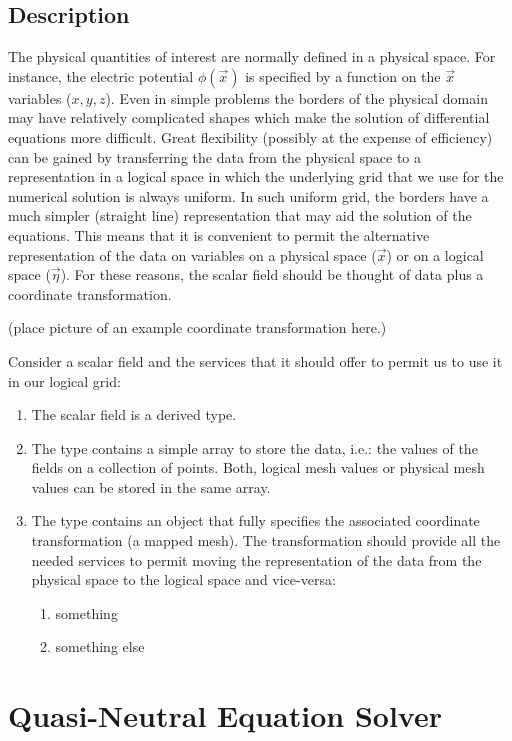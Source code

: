 \documentclass[]{report}   %
\begin{document}
\subsection{Description}
The physical quantities of interest are normally defined in a physical space. For instance, the electric potential $\phi(\vec{x})$ is specified by a function on the $\vec{x}$ variables ($x,y,z$). Even in simple problems the borders of the physical domain may have relatively complicated shapes which make the solution of differential equations more difficult. Great flexibility (possibly at the expense of efficiency) can be gained by transferring the data from the physical space to a representation in a logical space in which the underlying grid that we use for the numerical solution is always uniform. In such uniform grid, the borders have a much simpler (straight line) representation that may aid the solution of the equations. This means that it is convenient to permit the alternative representation of the data on variables on a physical space ($\vec{x}$) or on a logical space ($\vec{\eta}$). For these reasons, the scalar field should be thought of data plus a coordinate transformation. 

(place picture of an example coordinate transformation here.)

Consider a scalar field and the services that it should offer to permit us to use it in our logical grid:
\begin{enumerate}
  \item The scalar field is a derived type.
  \item The type contains a simple array to store the data, i.e.: the values of the fields on a collection of points. Both, logical mesh values or physical mesh values can be stored in the same array.
  \item The type contains an object that fully specifies the associated coordinate transformation (a mapped mesh). The transformation should provide all the needed services to permit moving the representation of the data from the physical space to the logical space and vice-versa:
  \begin{enumerate}
     \item something
     \item something else
   \end{enumerate}
\end{enumerate}





\section{Quasi-Neutral Equation Solver}
\end{document}
